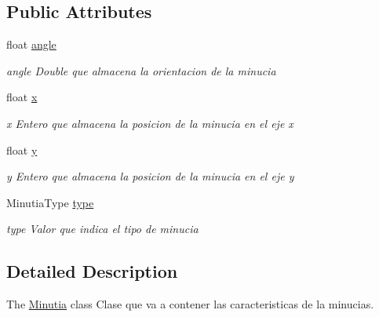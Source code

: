 \subsection*{Public Attributes}
\begin{DoxyCompactItemize}
\item 
\hypertarget{class_minutia_a50aa5fe07287adcc5106755e68f437dd}{float \hyperlink{class_minutia_a50aa5fe07287adcc5106755e68f437dd}{angle}}\label{class_minutia_a50aa5fe07287adcc5106755e68f437dd}

\begin{DoxyCompactList}\small\item\em angle Double que almacena la orientacion de la minucia \end{DoxyCompactList}\item 
\hypertarget{class_minutia_a64e1e7a198334f923b9ae536cf6348bd}{float \hyperlink{class_minutia_a64e1e7a198334f923b9ae536cf6348bd}{x}}\label{class_minutia_a64e1e7a198334f923b9ae536cf6348bd}

\begin{DoxyCompactList}\small\item\em x Entero que almacena la posicion de la minucia en el eje x \end{DoxyCompactList}\item 
\hypertarget{class_minutia_acce51490952cc57448b6fa861d4632bd}{float \hyperlink{class_minutia_acce51490952cc57448b6fa861d4632bd}{y}}\label{class_minutia_acce51490952cc57448b6fa861d4632bd}

\begin{DoxyCompactList}\small\item\em y Entero que almacena la posicion de la minucia en el eje y \end{DoxyCompactList}\item 
\hypertarget{class_minutia_a7f467139e7cd3928ebc71c3e2d4e3d7f}{Minutia\+Type \hyperlink{class_minutia_a7f467139e7cd3928ebc71c3e2d4e3d7f}{type}}\label{class_minutia_a7f467139e7cd3928ebc71c3e2d4e3d7f}

\begin{DoxyCompactList}\small\item\em type Valor que indica el tipo de minucia \end{DoxyCompactList}\end{DoxyCompactItemize}


\subsection{Detailed Description}
The \hyperlink{class_minutia}{Minutia} class Clase que va a contener las caracteristicas de la minucias. 

